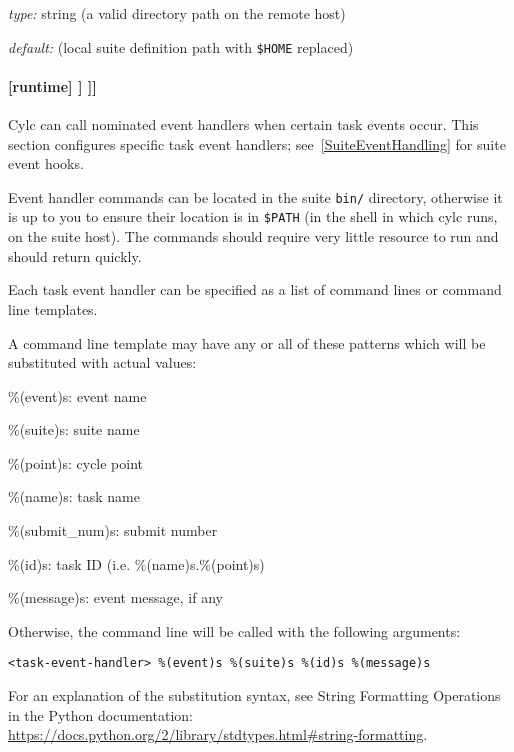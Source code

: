 \begin{myitemize}
\item {\em type:} string (a valid directory path on the remote host)
\item {\em default:} (local suite definition path with \lstinline=$HOME=
    replaced)
\end{myitemize}


\paragraph[{[[[}events{]]]}]{[runtime] \textrightarrow [[\_\_NAME\_\_]] \textrightarrow [[[events]]]}
\label{TaskEventHandling}

Cylc can call nominated event handlers when certain task events occur. This
section configures specific task event handlers; see~\ref{SuiteEventHandling} for
suite event hooks.

Event handler commands can be located in the suite \lstinline=bin/= directory,
otherwise it is up to you to ensure their location is in \lstinline=$PATH= (in
the shell in which cylc runs, on the suite host). The commands should require
very little resource to run and should return quickly.

Each task event handler can be specified as a list of command lines or command
line templates.

A command line template may have any or all of these patterns which will be
substituted with actual values:
\begin{myitemize}
    \item \%(event)s: event name
    \item \%(suite)s: suite name
    \item \%(point)s: cycle point
    \item \%(name)s: task name
    \item \%(submit\_num)s: submit number
    \item \%(id)s: task ID (i.e. \%(name)s.\%(point)s)
    \item \%(message)s: event message, if any
\end{myitemize}

Otherwise, the command line will be called with the following arguments:
\begin{lstlisting}
<task-event-handler> %(event)s %(suite)s %(id)s %(message)s
\end{lstlisting}

For an explanation of the substitution syntax, see String Formatting Operations
in the Python documentation:
\url{https://docs.python.org/2/library/stdtypes.html#string-formatting}.

